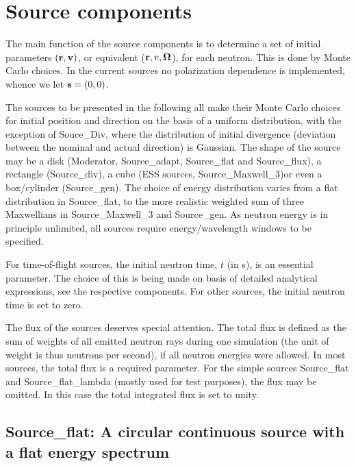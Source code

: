 
\chapter{Source components}
\label{c:source}
The main function of the source components is to determine a set of initial
parameters $({\bf r}, {\bf v})$, or equivalent (${\bf r}, v, \mbox{\boldmath $\Omega$} $),
for each neutron. This is done by Monte Carlo choices. 
In the current sources no polarization dependence is implemented, 
whence we let ${\bf s}=(0,0)$.

The sources to be presented in the following all make their Monte Carlo
choices for initial position and direction on the basis of a 
uniform distribution, with the exception of Souce\_Div, where the 
distribution of initial divergence (deviation between the nominal and
actual direction) is Gaussian. The shape of the source may be a disk (Moderator,  Source\_adapt, Source\_flat and Source\_flux), a rectangle (Source\_div), a cube (ESS sources, Source\_Maxwell\_3)or even a box/cylinder (Source\_gen). The choice of energy distribution
varies from a flat distribution in Source\_flat, to the more realistic
weighted sum of three Maxwellians in Source\_Maxwell\_3 and Source\_gen.
As neutron energy is in principle unlimited, all sources require
energy/wavelength windows to be specified.

For time-of-flight sources, the initial neutron time, $t$ (in s), is
an essential parameter. The choice of this is being made on basis of
detailed analytical expressions, see the respective components. 
For other sources, the initial neutron time is set to zero.

The flux of the sources deserves special attention. The total flux is defined
as the sum of weights of all emitted neutron rays during one simulation 
(the unit of weight is thus neutrons per second), if all neutron energies
were allowed. In most sources, the total flux is a required parameter.
For the simple sources Source\_flat and Source\_flat\_lambda (mostly used
for test purposes), the flux may be omitted. In this case the total integrated flux is set to unity.

\section{Source\_flat: A circular continuous source with a flat energy spectrum}
\label{source-flat}

